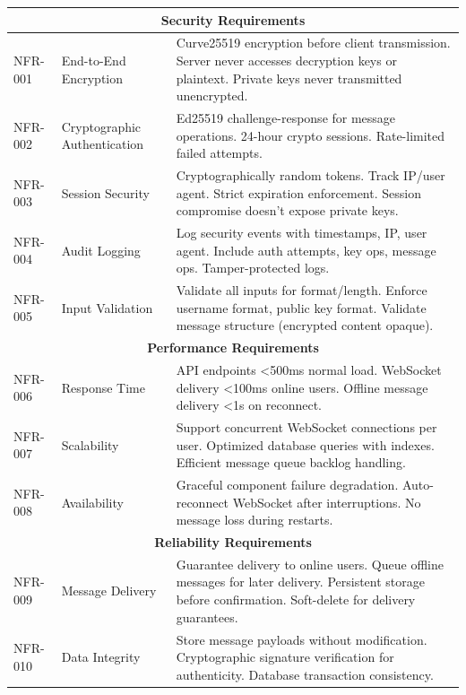 \documentclass[12pt,a4paper,openany]{book}
\begin{document}
\begin{longtable}{|p{2cm}|p{4cm}|p{8cm}|}
\multicolumn{3}{|c|}{\textbf{Security Requirements}} \\
\hline
NFR-001 & End-to-End Encryption & Curve25519 encryption before client transmission. Server never accesses decryption keys or plaintext. Private keys never transmitted unencrypted. \\
\hline
NFR-002 & Cryptographic Authentication & Ed25519 challenge-response for message operations. 24-hour crypto sessions. Rate-limited failed attempts. \\
\hline
NFR-003 & Session Security & Cryptographically random tokens. Track IP/user agent. Strict expiration enforcement. Session compromise doesn't expose private keys. \\
\hline
NFR-004 & Audit Logging & Log security events with timestamps, IP, user agent. Include auth attempts, key ops, message ops. Tamper-protected logs. \\
\hline
NFR-005 & Input Validation & Validate all inputs for format/length. Enforce username format, public key format. Validate message structure (encrypted content opaque). \\
\hline
\multicolumn{3}{|c|}{\textbf{Performance Requirements}} \\
\hline
NFR-006 & Response Time & API endpoints <500ms normal load. WebSocket delivery <100ms online users. Offline message delivery <1s on reconnect. \\
\hline
NFR-007 & Scalability & Support concurrent WebSocket connections per user. Optimized database queries with indexes. Efficient message queue backlog handling. \\
\hline
NFR-008 & Availability & Graceful component failure degradation. Auto-reconnect WebSocket after interruptions. No message loss during restarts. \\
\hline
\multicolumn{3}{|c|}{\textbf{Reliability Requirements}} \\
\hline
NFR-009 & Message Delivery & Guarantee delivery to online users. Queue offline messages for later delivery. Persistent storage before confirmation. Soft-delete for delivery guarantees. \\
\hline
NFR-010 & Data Integrity & Store message payloads without modification. Cryptographic signature verification for authenticity. Database transaction consistency. \\
\hline
\end{longtable}
\markboth{\leftmark}{\rightmark} %
\pagestyle{fancy} %
\end{document}
